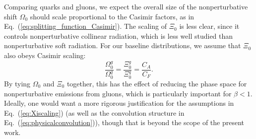 \documentclass[11pt,letterpaper]{article}
\DeclareRobustCommand{\Eq}[1]{Eq.~(\ref{#1})}
\newcommand{\be}{\begin{equation}}
\newcommand{\ee}{\end{equation}}
\begin{document}
Comparing quarks and gluons, we expect the overall size of the nonperturbative shift $\Omega_0$ should scale proportional to the Casimir factors, as in \Eq{eq:splitting_function_Casimir}.  The scaling of $\Xi_0$ is less clear, since it controls nonperturbative collinear radiation, which is less well studied than nonperturbative soft radiation.  For our baseline distributions, we assume that $\Xi_0$ also obeys Casimir scaling:
\be
\label{eq:Xiscaling}
\frac{\Omega_0^g}{\Omega_0^q} = \frac{\Xi_0^g}{\Xi_0^q} = \frac{C_A}{C_F}.
\ee
By tying $\Omega_0$ and $\Xi_0$ together, this has the effect of reducing the phase space for nonperturbative emissions from gluons, which is particularly important for $\beta < 1$.  Ideally, one would want a more rigorous justification for the assumptions in \Eq{eq:Xiscaling} (as well as the convolution structure in \Eq{eq:physicalconvolution}), though that is beyond the scope of the present work.
\end{document}
